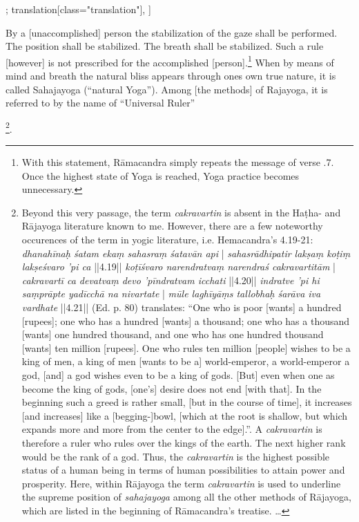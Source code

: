 \begin{alignment}[
  texts=edition[class="edition"];
  translation[class="translation"],
  ]
\begin{translation}
\begin{tlate}[p58_04]
\indent By a [unaccomplished] person the stabilization of the gaze shall be performed. The position shall be stabilized. The breath shall be stabilized. Such a rule [however] is not prescribed for the accomplished [person].\footnote{With this statement, Rāmacandra simply repeats the message of verse .7. Once the highest state of Yoga is reached, Yoga practice becomes unnecessary.} When by means of mind and breath the natural bliss appears through ones own true nature, it is called Sahajayoga (``natural Yoga''). Among [the methods] of Rajayoga, it is referred to by the name of ``Universal Ruler''\begin{buber}[f58_2]\footnote{Beyond this very passage, the term \textit{cakravartin} is absent in the Haṭha- and Rājayoga literature known to me. However, there are a few noteworthy occurences of the term in yogic literature, i.e. Hemacandra's  4.19-21: \textit{dhanahīnaḥ śatam ekaṃ sahasraṃ śatavān api} | \textit{sahasrādhipatir lakṣaṃ koṭiṃ lakṣeśvaro ’pi ca} ||4.19|| \textit{koṭīśvaro narendratvaṃ narendraś cakravartitām} | \textit{cakravartī ca devatvaṃ devo ’pīndratvam icchati} ||4.20|| \textit{indratve ’pi hi saṃprāpte yadīcchā na nivartate} | \textit{mūle laghīyāṃs tallobhaḥ śarāva iva vardhate} ||4.21|| \citeauthor{hemacandras} (Ed. p. 80) translates: ``One who is poor [wants] a hundred [rupees]; one who has a hundred [wants] a thousand; one who has a thousand [wants] one hundred thousand, and one who has one hundred thousand [wants] ten million [rupees]. One who rules ten million [people] wishes to be a king of men, a king of men [wants to be a] world-emperor, a world-emperor a god, [and] a god wishes even to be a king of gods. [But] even when one as become the king of gods, [one's] desire does not end [with that]. In the beginning such a greed is rather small, [but in the course of time], it increases [and increases] like a [begging-]bowl, [which at the root is shallow, but which expands more and more from the center to the edge].''. A \textit{cakravartin} is therefore a ruler who rules over the kings of the earth. The next higher rank would be the rank of a god. Thus, the \textit{cakravartin} is the highest possible status of a human being in terms of human possibilities to attain power and prosperity. Here, within Rājayoga the term \textit{cakravartin} is used to underline the supreme position of \textit{sahajayoga} among all the other methods of Rājayoga, which are listed in the beginning of Rāmacandra's treatise. \ldots}.\end{buber}
\flushpage 
    \end{tlate}
  \end{translation}
\end{alignment}
\pagebreak
\cleardoublepage
{}
